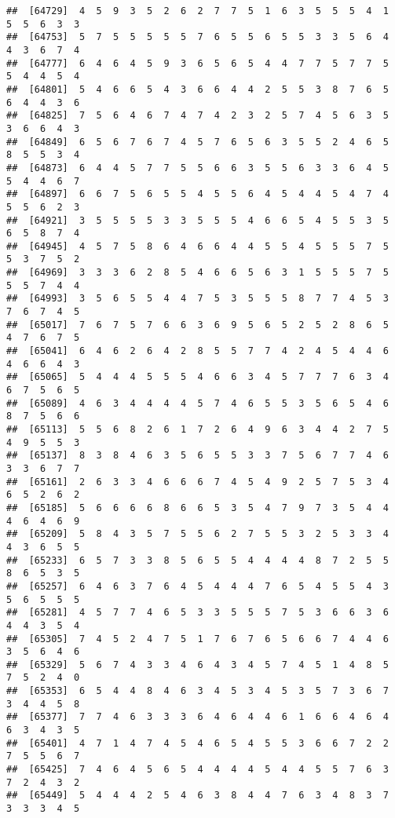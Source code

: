 \documentclass[
]{book}
\begin{document}
\begin{verbatim}
##  [64729]  4  5  9  3  5  2  6  2  7  7  5  1  6  3  5  5  5  4  1  5  5  6  3  3
##  [64753]  5  7  5  5  5  5  5  7  6  5  5  6  5  5  3  3  5  6  4  4  3  6  7  4
##  [64777]  6  4  6  4  5  9  3  6  5  6  5  4  4  7  7  5  7  7  5  5  4  4  5  4
##  [64801]  5  4  6  6  5  4  3  6  6  4  4  2  5  5  3  8  7  6  5  6  4  4  3  6
##  [64825]  7  5  6  4  6  7  4  7  4  2  3  2  5  7  4  5  6  3  5  3  6  6  4  3
##  [64849]  6  5  6  7  6  7  4  5  7  6  5  6  3  5  5  2  4  6  5  8  5  5  3  4
##  [64873]  6  4  4  5  7  7  5  5  6  6  3  5  5  6  3  3  6  4  5  5  4  4  6  7
##  [64897]  6  6  7  5  6  5  5  4  5  5  6  4  5  4  4  5  4  7  4  5  5  6  2  3
##  [64921]  3  5  5  5  5  3  3  5  5  5  4  6  6  5  4  5  5  3  5  6  5  8  7  4
##  [64945]  4  5  7  5  8  6  4  6  6  4  4  5  5  4  5  5  5  7  5  5  3  7  5  2
##  [64969]  3  3  3  6  2  8  5  4  6  6  5  6  3  1  5  5  5  7  5  5  5  7  4  4
##  [64993]  3  5  6  5  5  4  4  7  5  3  5  5  5  8  7  7  4  5  3  7  6  7  4  5
##  [65017]  7  6  7  5  7  6  6  3  6  9  5  6  5  2  5  2  8  6  5  4  7  6  7  5
##  [65041]  6  4  6  2  6  4  2  8  5  5  7  7  4  2  4  5  4  4  6  4  6  6  4  3
##  [65065]  5  4  4  4  5  5  5  4  6  6  3  4  5  7  7  7  6  3  4  6  7  5  6  5
##  [65089]  4  6  3  4  4  4  4  5  7  4  6  5  5  3  5  6  5  4  6  8  7  5  6  6
##  [65113]  5  5  6  8  2  6  1  7  2  6  4  9  6  3  4  4  2  7  5  4  9  5  5  3
##  [65137]  8  3  8  4  6  3  5  6  5  5  3  3  7  5  6  7  7  4  6  3  3  6  7  7
##  [65161]  2  6  3  3  4  6  6  6  7  4  5  4  9  2  5  7  5  3  4  6  5  2  6  2
##  [65185]  5  6  6  6  6  8  6  6  5  3  5  4  7  9  7  3  5  4  4  4  6  4  6  9
##  [65209]  5  8  4  3  5  7  5  5  6  2  7  5  5  3  2  5  3  3  4  4  3  6  5  5
##  [65233]  6  5  7  3  3  8  5  6  5  5  4  4  4  4  8  7  2  5  5  8  6  5  3  5
##  [65257]  6  4  6  3  7  6  4  5  4  4  4  7  6  5  4  5  5  4  3  5  6  5  5  5
##  [65281]  4  5  7  7  4  6  5  3  3  5  5  5  7  5  3  6  6  3  6  4  4  3  5  4
##  [65305]  7  4  5  2  4  7  5  1  7  6  7  6  5  6  6  7  4  4  6  3  5  6  4  6
##  [65329]  5  6  7  4  3  3  4  6  4  3  4  5  7  4  5  1  4  8  5  7  5  2  4  0
##  [65353]  6  5  4  4  8  4  6  3  4  5  3  4  5  3  5  7  3  6  7  3  4  4  5  8
##  [65377]  7  7  4  6  3  3  3  6  4  6  4  4  6  1  6  6  4  6  4  6  3  4  3  5
##  [65401]  4  7  1  4  7  4  5  4  6  5  4  5  5  3  6  6  7  2  2  7  5  5  6  7
##  [65425]  7  4  6  4  5  6  5  4  4  4  4  5  4  4  5  5  7  6  3  7  2  4  3  2
##  [65449]  5  4  4  4  2  5  4  6  3  8  4  4  7  6  3  4  8  3  7  3  3  3  4  5

\end{verbatim}
\end{document}
